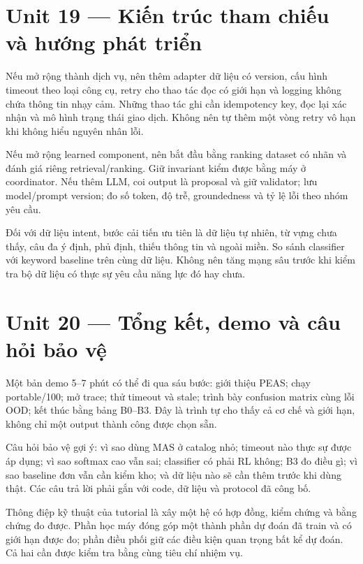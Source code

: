\section{Unit 19 --- Kiến trúc tham chiếu và hướng phát
triển}\label{unit-19-kiux1ebfn-truxfac-tham-chiux1ebfu-vuxe0-hux1b0ux1edbng-phuxe1t-triux1ec3n}

Nếu mở rộng thành dịch vụ, nên thêm adapter dữ liệu có version, cấu hình
timeout theo loại công cụ, retry cho thao tác đọc có giới hạn và logging
không chứa thông tin nhạy cảm. Những thao tác ghi cần idempotency key,
đọc lại xác nhận và mô hình trạng thái giao dịch. Không nên tự thêm một
vòng retry vô hạn khi không hiểu nguyên nhân lỗi.

Nếu mở rộng learned component, nên bắt đầu bằng ranking dataset có nhãn
và đánh giá riêng retrieval/ranking. Giữ invariant kiểm được bằng máy ở
coordinator. Nếu thêm LLM, coi output là proposal và giữ validator; lưu
model/prompt version; đo số token, độ trễ, groundedness và tỷ lệ lỗi
theo nhóm yêu cầu.

Đối với dữ liệu intent, bước cải tiến ưu tiên là dữ liệu tự nhiên, từ
vựng chưa thấy, câu đa ý định, phủ định, thiếu thông tin và ngoài miền.
So sánh classifier với keyword baseline trên cùng dữ liệu. Không nên
tăng mạng sâu trước khi kiểm tra bộ dữ liệu có thực sự yêu cầu năng lực
đó hay chưa.

\section{Unit 20 --- Tổng kết, demo và câu hỏi bảo
vệ}\label{unit-20-tux1ed5ng-kux1ebft-demo-vuxe0-cuxe2u-hux1ecfi-bux1ea3o-vux1ec7}

Một bản demo 5--7 phút có thể đi qua sáu bước: giới thiệu PEAS; chạy
portable/100; mở trace; thử timeout và stale; trình bày confusion matrix
cùng lỗi OOD; kết thúc bằng bảng B0--B3. Đây là trình tự cho thấy cả cơ
chế và giới hạn, không chỉ một output thành công được chọn sẵn.

Câu hỏi bảo vệ gợi ý: vì sao dùng MAS ở catalog nhỏ; timeout nào thực sự
được áp dụng; vì sao softmax cao vẫn sai; classifier có phải RL không;
B3 đo điều gì; vì sao baseline đơn vẫn cần kiểm kho; và dữ liệu nào sẽ
cần thêm trước khi dùng thật. Các câu trả lời phải gắn với code, dữ liệu
và protocol đã công bố.

Thông điệp kỹ thuật của tutorial là xây một hệ có hợp đồng, kiểm chứng
và bằng chứng đo được. Phần học máy đóng góp một thành phần dự đoán đã
train và có giới hạn được đo; phần điều phối giữ các điều kiện quan
trọng bất kể dự đoán. Cả hai cần được kiểm tra bằng cùng tiêu chí nhiệm
vụ.

